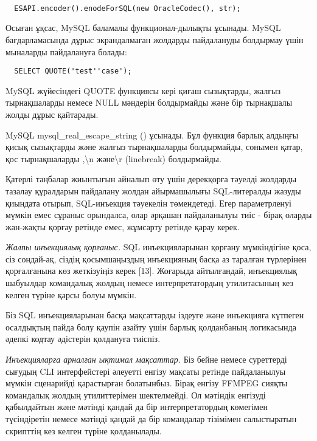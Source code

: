 \begin{verbatim}

  ESAPI.encoder().enodeForSQL(new OracleCodec(), str);

\end{verbatim}
\begin{multicols}{2}

Осыған ұқсас, MySQL баламалы функционал-дылықты ұсынады. MySQL
бағдарламасында дұрыс экрандалмаған жолдарды пайдалануды болдырмау үшін
мыналарды пайдалануға болады:
\end{multicols}

\begin{verbatim}
  SELECT QUOTE('test''case');
\end{verbatim}
\begin{multicols}{2}

MySQL жүйесіндегі QUOTE функциясы кері қиғаш сызықтарды, жалғыз
тырнақшаларды немесе NULL мәндерін болдырмайды және бір тырнақшалы жолды
дұрыс қайтарады.

MySQL mysql\_real\_escape\_string () ұсынады. Бұл функция барлық алдыңғы
қисық сызықтарды және жалғыз тырнақшаларды болдырмайды, сонымен қатар,
қос тырнақшаларды ,\textbackslash n және\textbackslash r (linebreak)
болдырмайды.

Қатерлі таңбалар жиынтығын айналып өту үшін дерекқорға тәуелді жолдарды
тазалау құралдарын пайдалану жолдан айырмашылығы SQL-литералды жазуды
қиындата отырып, SQL-инъекция тәуекелін төмендетеді. Егер параметрленуі
мүмкін емес сұраныс орындалса, олар әрқашан пайдаланылуы тиіс - бірақ
оларды жан-жақты қорғау ретінде емес, жұмсарту ретінде қарау керек.

\emph{Жалпы инъекциялық қорғаныс.} SQL инъекцияларынан қорғану
мүмкіндігіне қоса, сіз сондай-ақ, сіздің қосымшаңыздың инъекцияның басқа
аз таралған түрлерінен қорғалғанына көз жеткізуіңіз керек {[}13{]}.
Жоғарыда айтылғандай, инъекциялық шабуылдар командалық жолдың немесе
интерпретатордың утилитасының кез келген түріне қарсы болуы мүмкін.

Біз SQL инъекцияларынан басқа мақсаттарды іздеуге және инъекцияға
күтпеген осалдықтың пайда болу қаупін азайту үшін барлық қолданбаның
логикасында әдепкі кодтау әдістерін қолдануға тиіспіз.

\emph{Инъекцияларға арналған ықтимал мақсаттар.} Біз бейне немесе
суреттерді сығудың CLI интерфейстері әлеуетті енгізу мақсаты ретінде
пайдаланылуы мүмкін сценарийді қарастырған болатынбыз. Бірақ енгізу
FFMPEG сияқты командалық жолдың утилиттерімен шектелмейді. Ол мәтіндік
енгізуді қабылдайтын және мәтінді қандай да бір интерпретатордың
көмегімен түсіндіретін немесе мәтінді қандай да бір командалар тізімімен
салыстыратын скрипттің кез келген түріне қолданылады.


\end{multicols}
